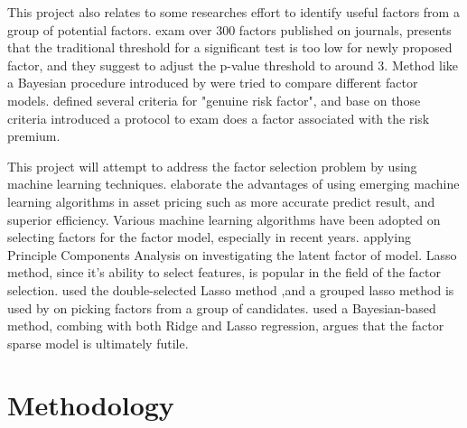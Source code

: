 \documentclass[12pt]{article}
\begin{document}
	
	This project also relates to some researches effort to identify useful factors from a group of potential factors.
 exam over 300 factors published on journals, presents that the traditional threshold for a significant test is too low for newly proposed factor, and they suggest to adjust the p-value threshold to around 3. 
Method like a Bayesian procedure introduced by  were tried to compare different factor models.
 defined several criteria for "genuine risk factor", and base on those criteria introduced a protocol to exam does a factor associated with the risk premium.


This project will attempt to address the factor selection problem by using machine learning techniques.
 elaborate the advantages of using emerging machine learning algorithms in asset pricing 
such as more accurate predict result, and superior efficiency.
Various machine learning algorithms have been adopted on selecting factors for the factor model, especially in recent years.
 applying Principle Components Analysis on investigating the latent factor of model. 
Lasso method, since it's ability to select features, is popular in the field of the factor selection.
 used the double-selected Lasso method \cite{Belloni2014},and a grouped lasso method \cite{Huang2010} is used by  on picking factors from a group of candidates. 
 used a Bayesian-based method, combing with both Ridge and Lasso regression, argues that the factor sparse model is ultimately futile. 


	\section{Methodology}
\end{document}
